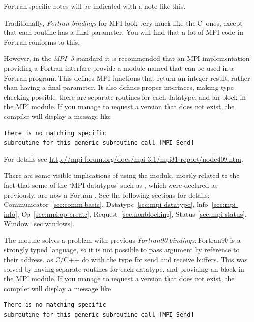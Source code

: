 \begin{fortrannote}
  Fortran-specific notes will be indicated with a note like this.
\end{fortrannote}

Traditionally, \emph{Fortran bindings} for MPI look very much like the C~ones,
except that each routine has a final 
parameter.
You will find that a lot of MPI code in Fortran conforms to this.

%
However, in the \emph{MPI~3}%
 standard it is recommended that
an MPI implementation providing a Fortran interface provide a
module named  that can be used in a Fortran program.
This defines MPI functions that return an integer result, rather than
having a final parameter. It also defines proper interfaces, making
type checking possible:
there are separate routines for each datatype, and an  block
in the MPI module. If you manage to request a version that does not exist,
the compiler will display a message like
\begin{verbatim}
There is no matching specific 
subroutine for this generic subroutine call [MPI_Send]
\end{verbatim}
%
For details see
\url{http://mpi-forum.org/docs/mpi-3.1/mpi31-report/node409.htm}.

There are some visible implications of using the  module,
mostly related to the fact that some of the `MPI datatypes' such as
, which were declared as 
previously, are now a Fortran .
See the following sections for details:
Communicator~\ref{sec:comm-basic}, Datatype~\ref{sec:mpi-datatype},
Info~\ref{sec:mpi-info}, Op~\ref{sec:mpi:op-create},
Request~\ref{sec:nonblocking}, Status~\ref{sec:mpi-status},
Window~\ref{sec:windows}.

The  module solves a problem with previous
\emph{Fortran90 bindings}:
%
Fortran90 is a strongly typed language, so it is not possible to pass
argument by reference to their address, as C/C++ do with the 
type for send and receive buffers. This was solved by having
separate routines for each datatype, and providing an  block
in the MPI module. If you manage to request a version that does not exist,
the compiler will display a message like
\begin{verbatim}
There is no matching specific 
subroutine for this generic subroutine call [MPI_Send]
\end{verbatim}


